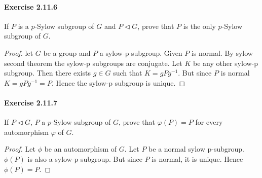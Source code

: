 \documentclass{article}
\begin{document}
\paragraph{Exercise 2.11.6} If $P$ is a $p$-Sylow subgroup of $G$ and $P \triangleleft G$, prove that $P$ is the only $p$-Sylow subgroup of $G$.
\begin{proof}
    let $G$ be a group and $P$ a sylow-p subgroup. Given $P$ is normal. By sylow second theorem the sylow-p subgroups are conjugate. Let $K$ be any other sylow-p subgroup. Then there exists $g \in G$ such that $K=g P g^{-1}$. But since $P$ is normal $K=g P g^{-1}=P$. Hence the sylow-p subgroup is unique.
\end{proof}


\paragraph{Exercise 2.11.7} If $P \triangleleft G$, $P$ a $p$-Sylow subgroup of $G$, prove that $\varphi(P) = P$ for every automorphism $\varphi$ of $G$.
\begin{proof}
    Let $\phi$ be an automorphism of $G$. Let $P$ be a normal sylow p-subgroup. $\phi(P)$ is also a sylow-p subgroup. But since $P$ is normal, it is unique. Hence $\phi(P)=P$.
\end{proof}
\end{document}
